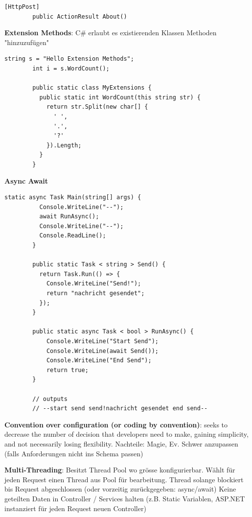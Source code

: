 \documentclass[10pt,landscape]{article}
\begin{document}
\begin{multicols}{2}
\begin{lstlisting}[style=CSharp]
        [HttpPost]
        public ActionResult About()
        \end{lstlisting}

        \textbf{Extension Methods}: C\# erlaubt es existierenden Klassen Methoden "hinzuzufügen"
        \begin{lstlisting}[style=CSharp]
        string s = "Hello Extension Methods";
        int i = s.WordCount();

        public static class MyExtensions {
          public static int WordCount(this string str) {
            return str.Split(new char[] {
              ' ',
              '.',
              '?'
            }).Length;
          }
        }
        \end{lstlisting}

        \textbf{Async Await}
        \begin{lstlisting}[style=CSharp]
        static async Task Main(string[] args) {
          Console.WriteLine("--");
          await RunAsync();
          Console.WriteLine("--");
          Console.ReadLine();
        }

        public static Task < string > Send() {
          return Task.Run(() => {
            Console.WriteLine("Send!");
            return "nachricht gesendet";
          });
        }

        public static async Task < bool > RunAsync() {
            Console.WriteLine("Start Send");
            Console.WriteLine(await Send());
            Console.WriteLine("End Send");
            return true;
        }

        // outputs
        // --start send send!nachricht gesendet end send--
        \end{lstlisting}

        \textbf{Convention over configuration (or coding by convention)}: seeks to decrease the number of decision that developers need to make, gaining simplicity, and not necessarily losing flexibility.
        Nachteile: Magie, Ev. Schwer anzupassen (falls Anforderungen nicht ins Schema passen)

        \textbf{Multi-Threading}: Besitzt Thread Pool wo grösse konfigurierbar. Wählt für jeden Request einen Thread aus Pool für bearbeitung.
        Thread solange blockiert bis Request abgeschlossen (oder vorzeitig zurückgegeben: async/await)
        Keine geteilten Daten in Controller / Services halten (z.B. Static Variablen, ASP.NET instanziert für jeden Request neuen Controller)


\end{multicols}
\end{document}

